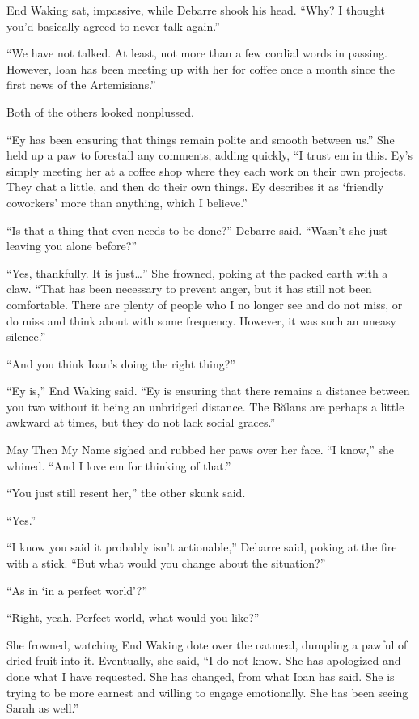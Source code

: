 End Waking sat, impassive, while Debarre shook his head. ``Why? I thought you'd basically agreed to never talk again.''

``We have not talked. At least, not more than a few cordial words in passing. However, Ioan has been meeting up with her for coffee once a month since the first news of the Artemisians.''

Both of the others looked nonplussed.

``Ey has been ensuring that things remain polite and smooth between us.'' She held up a paw to forestall any comments, adding quickly, ``I trust em in this. Ey's simply meeting her at a coffee shop where they each work on their own projects. They chat a little, and then do their own things. Ey describes it as `friendly coworkers' more than anything, which I believe.''

``Is that a thing that even needs to be done?'' Debarre said. ``Wasn't she just leaving you alone before?''

``Yes, thankfully. It is just\ldots{}'' She frowned, poking at the packed earth with a claw. ``That has been necessary to prevent anger, but it has still not been comfortable. There are plenty of people who I no longer see and do not miss, or do miss and think about with some frequency. However, it was such an uneasy silence.''

``And you think Ioan's doing the right thing?''

``Ey is,'' End Waking said. ``Ey is ensuring that there remains a distance between you two without it being an unbridged distance. The Bălans are perhaps a little awkward at times, but they do not lack social graces.''

May Then My Name sighed and rubbed her paws over her face. ``I know,'' she whined. ``And I love em for thinking of that.''

``You just still resent her,'' the other skunk said.

``Yes.''

``I know you said it probably isn't actionable,'' Debarre said, poking at the fire with a stick. ``But what would you change about the situation?''

``As in `in a perfect world'?''

``Right, yeah. Perfect world, what would you like?''

She frowned, watching End Waking dote over the oatmeal, dumpling a pawful of dried fruit into it. Eventually, she said, ``I do not know. She has apologized and done what I have requested. She has changed, from what Ioan has said. She is trying to be more earnest and willing to engage emotionally. She has been seeing Sarah as well.''

